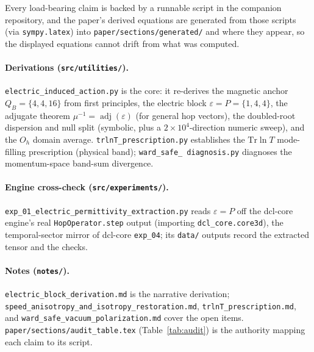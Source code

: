 \label{sec:code_and_data}

Every load-bearing claim is backed by a runnable script in the companion
repository, and the paper's derived equations are generated from those scripts
(via \texttt{sympy.latex}) into \texttt{paper/sections/generated/} and
\verb|| where they appear, so the displayed equations cannot drift from
what was computed.

\paragraph{Derivations (\texttt{src/utilities/}).}
\texttt{electric\_induced\_action.py} is the core: it re-derives the magnetic
anchor $Q_B=\{4,4,16\}$ from first principles, the electric block
$\varepsilon=P=\{1,4,4\}$, the adjugate theorem
$\mu^{-1}=\operatorname{adj}(\varepsilon)$ (for general hop vectors), the doubled-root
dispersion and null split (symbolic, plus a $2\times10^4$-direction numeric sweep),
and the $O_h$ domain average. \texttt{trlnT\_prescription.py} establishes the
$\mathrm{Tr}\ln T$ mode-filling prescription (physical band); \texttt{ward\_safe\_
diagnosis.py} diagnoses the momentum-space band-sum divergence.

\paragraph{Engine cross-check (\texttt{src/experiments/}).}
\texttt{exp\_01\_electric\_permittivity\_extraction.py} reads $\varepsilon=P$ off the
dcl-core engine's real \texttt{HopOperator.step} output (importing
\texttt{dcl\_core.core3d}), the temporal-sector mirror of dcl-core \texttt{exp\_04};
its \texttt{data/} outputs record the extracted tensor and the checks.

\paragraph{Notes (\texttt{notes/}).}
\texttt{electric\_block\_derivation.md} is the narrative derivation;
\texttt{speed\_anisotropy\_and\_isotropy\_restoration.md},
\texttt{trlnT\_prescription.md}, and \texttt{ward\_safe\_vacuum\_polarization.md}
cover the open items. \texttt{paper/sections/audit\_table.tex}
(Table~\ref{tab:audit}) is the authority mapping each claim to its script.
